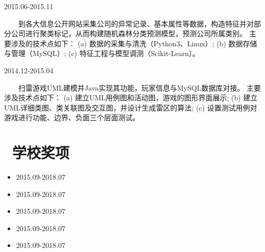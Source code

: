 \documentclass{resume}
\begin{document}
{{              {2015.06-2015.11}

{\ \ \ \ 到各大信息公开网站采集公司的异常记录、基本属性等数据，构造特征并对部分公司进行聚类标记，从而构建随机森林分类预测模型，预测公司所属类别。
主要涉及的技术点如下：
(a) 数据的采集与清洗（Python3、Linux）;
(b) 数据存储与管理（MySQL）;
(c) 特征工程与模型调测（Scikit-Learn）。
  
\medskip










                       {2014.12-2015.04}

{\ \ \ \ 扫雷游戏UML建模并Java实现其功能，玩家信息与MySQL数据库对接。
主要涉及技术点如下：
(a) 建立UML用例图和活动图，游戏的图形界面展示;
(b) 建立UML详细类图、类关联图及交互图，并设计生成雷区的算法;
(c) 设置测试用例对游戏进行功能、边界、负面三个层面测试。 }
  
\medskip

















\section{   \faTrophy   \ 学校奖项}


\begin{itemize} [parsep=0.5ex]

\item   {}                                      {2015.09-2018.07}
\item   {}                                         {2015.09-2018.07}
\item   {}                                         {2015.09-2018.07}
\item   {}                                         {2015.09-2018.07}
\item   {}                                    {2015.09-2018.07}


\end{itemize}}}}
\end{document}
